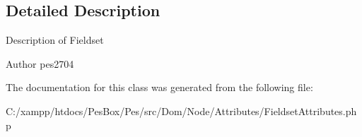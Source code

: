 \subsection{Detailed Description}
Description of Fieldset

\begin{DoxyAuthor}{Author}
pes2704 
\end{DoxyAuthor}


The documentation for this class was generated from the following file\+:\begin{DoxyCompactItemize}
\item 
C\+:/xampp/htdocs/\+Pes\+Box/\+Pes/src/\+Dom/\+Node/\+Attributes/Fieldset\+Attributes.\+php\end{DoxyCompactItemize}
